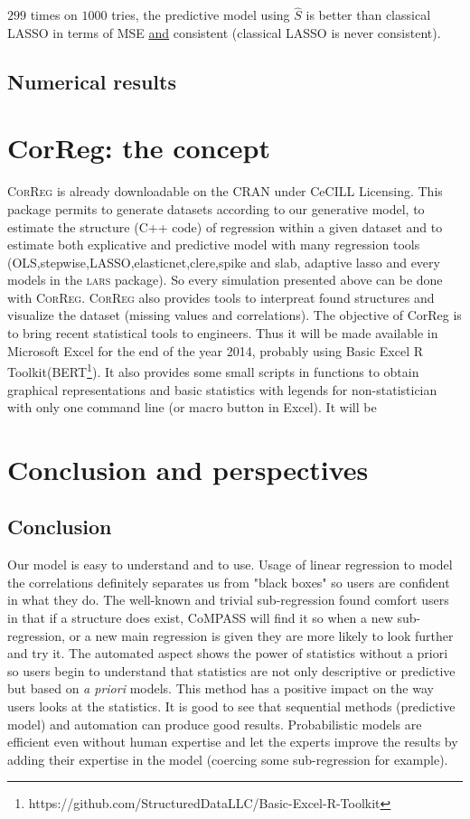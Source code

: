 \documentclass[12pt,a4paper]{report}
\begin{document}
		
		$299$ times on $1000$ tries, the predictive model using $\hat{S}$ is better than classical LASSO in terms of MSE \underline{and} consistent (classical LASSO is never consistent).
		

	\section{Numerical results}

\chapter{CorReg: the concept}	
	
		\textsc{CorReg} is already downloadable on the CRAN under CeCILL Licensing. This package permits to generate datasets according to our generative model, to estimate the structure (C++ code) of regression within a given dataset and to estimate both explicative and predictive model with many regression tools (OLS,stepwise,LASSO,elasticnet,clere,spike and slab, adaptive lasso and every models in the \textsc{lars} package). So every simulation presented above can be done with \textsc{CorReg}.
	\textsc{CorReg} also provides tools to interpreat found structures and visualize the dataset (missing values and correlations). %
	The objective of CorReg is to bring recent statistical tools to engineers. Thus it will be made  available in Microsoft Excel for the end of the year 2014, probably using Basic Excel R Toolkit(BERT\footnote{https://github.com/StructuredDataLLC/Basic-Excel-R-Toolkit}). It also provides some small scripts in functions to obtain graphical representations and basic statistics with legends for non-statistician with only one command line (or macro button in Excel). It will be
	
\chapter{Conclusion and perspectives}
	\section{Conclusion}
		Our model is easy to understand and to use. Usage of linear regression to model the correlations definitely separates us from "black boxes" so users are confident in what they do. The well-known and trivial sub-regression found comfort users in that if a structure does exist, CoMPASS will find it so when a new sub-regression, or a new main regression is given they are more likely to look further and try it. The automated aspect shows the power of statistics without a priori so users begin to understand that statistics are not only descriptive or predictive but based on {\it a priori} models. This method has a positive impact on the way users looks at the statistics.
			It is good to see that sequential methods (predictive model) and automation can produce good results. Probabilistic models are efficient even without human expertise and let the experts improve the results by adding their expertise in the model (coercing some sub-regression for example).
		
\end{document}
